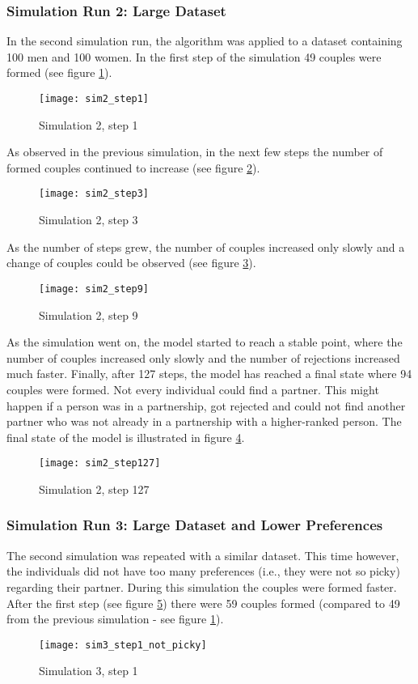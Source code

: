 \clearpage
\subsubsection{Simulation Run 2: Large Dataset}
In the second simulation run, the algorithm was applied to a dataset containing 100 men and 100 women. 
In the first step of the simulation 49 couples were formed (see figure \ref{fig:sim2_step1}).
\begin{figure}[H]
  \centering
  \texttt{[image: sim2\_step1]}
	\caption{Simulation 2, step 1}
	\label{fig:sim2_step1}
\end{figure}

As observed in the previous simulation, in the next few steps the number of formed couples continued to increase (see figure \ref{fig:sim2_step3}).
\begin{figure}[H]
  \centering
  \texttt{[image: sim2\_step3]}
	\caption{Simulation 2, step 3}
	\label{fig:sim2_step3}
\end{figure}

As the number of steps grew, the number of couples increased only slowly and a change of couples could be observed (see figure \ref{fig:sim2_step9}).
\begin{figure}[H]
  \centering
  \texttt{[image: sim2\_step9]}
	\caption{Simulation 2, step 9}
	\label{fig:sim2_step9}
\end{figure}

As the simulation went on, the model started to reach a stable point, where the number of couples increased only slowly and the number of rejections increased much faster. 
Finally, after 127 steps, the model has reached a final state where 94 couples were formed. Not every individual could find a partner. This might happen if a person was in a partnership, got rejected and could not find another partner who was not already in a partnership with a higher-ranked person.
The final state of the model is illustrated in figure \ref{fig:sim2_step127}.
\begin{figure}[H]
  \centering
  \texttt{[image: sim2\_step127]}
	\caption{Simulation 2, step 127}
	\label{fig:sim2_step127}
\end{figure}

\clearpage
\subsubsection{Simulation Run 3: Large Dataset and Lower Preferences}
The second simulation was repeated with a similar dataset. 
This time however, the individuals did not have too many preferences (i.e., they were not so picky) regarding their partner.
During this simulation the couples were formed faster. After the first step (see figure \ref{fig:sim3_step1_not_picky}) there were 59 couples formed (compared to 49 from the previous simulation - see figure \ref{fig:sim2_step1}).
\begin{figure}[H]
  \centering
  \texttt{[image: sim3\_step1\_not\_picky]}
	\caption{Simulation 3, step 1}
	\label{fig:sim3_step1_not_picky}
\end{figure}


